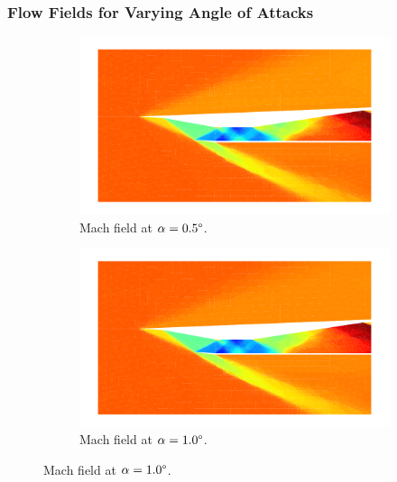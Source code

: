 \pagebreak
\subsubsection{Flow Fields for Varying Angle of Attacks}
\begin{figure}[h]
    \centering
    \begin{subfigure}[h]{0.48\linewidth}
        \centering
        \includegraphics[width=\linewidth]{rep/q5/mach_a5.pdf}
        \caption{Mach field at $\alpha=0.5\degree$.}\label{fig:mach05}
    \end{subfigure}
    \begin{subfigure}[h]{0.48\linewidth}
        \centering
        \includegraphics[width=\linewidth]{rep/q5/mach_a10.pdf}
        \caption{Mach field at $\alpha=1.0\degree$.}
    \end{subfigure}


\end{figure}
